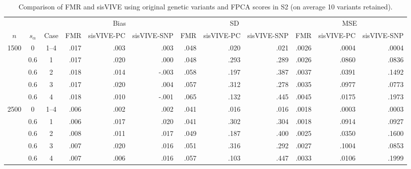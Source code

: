 \begin{table}[H]\centering\small
\caption{Comparison of FMR and sisVIVE using original genetic variants and FPCA scores in S2 (on average 10 variants retained).}\label{tab:S4}
\begin{tabular}{cccrrrrrrrrr}
\toprule
& & & \multicolumn{3}{c}{Bias} & \multicolumn{3}{c}{SD} & \multicolumn{3}{c}{MSE} \\
\cmidrule(lr){4-6} \cmidrule(lr){7-9} \cmidrule(lr){10-12}
$n$ & $s_\alpha$ & Case & FMR & sisVIVE-PC & sisVIVE-SNP & FMR & sisVIVE-PC & sisVIVE-SNP & FMR & sisVIVE-PC & sisVIVE-SNP \\
\midrule
1500 & 0 & 1--4 & .017 & .003 & .003 & .048 & .020 & .021 & .0026 & .0004 & .0004 \\
 & 0.6 & 1 & .017 & .020 & .000 & .048 & .293 & .289 & .0026 & .0860 & .0836 \\
 & 0.6 & 2 & .018 & .014 & -.003 & .058 & .197 & .387 & .0037 & .0391 & .1492 \\
 & 0.6 & 3 & .017 & .020 & .004 & .057 & .312 & .278 & .0035 & .0977 & .0773 \\
 & 0.6 & 4 & .018 & .010 & -.001 & .065 & .132 & .445 & .0045 & .0175 & .1973 \\
2500 & 0 & 1--4 & .006 & .002 & .002 & .041 & .016 & .016 & .0018 & .0003 & .0003 \\
 & 0.6 & 1 & .006 & .017 & .020 & .041 & .302 & .304 & .0018 & .0914 & .0927 \\
 & 0.6 & 2 & .008 & .011 & .017 & .049 & .187 & .400 & .0025 & .0350 & .1600 \\
 & 0.6 & 3 & .007 & .020 & .016 & .051 & .316 & .292 & .0027 & .1004 & .0853 \\
 & 0.6 & 4 & .007 & .006 & .016 & .057 & .103 & .447 & .0033 & .0106 & .1999 \\
\bottomrule
\end{tabular}
\end{table}
